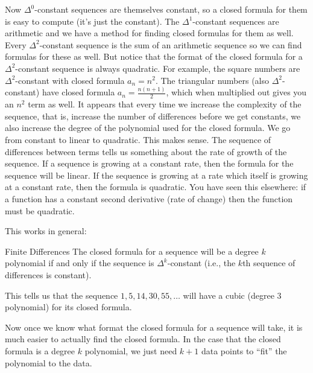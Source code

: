 \documentclass[12pt]{article}
\begin{document}
Now $\Delta^0$-constant sequences are themselves constant, so a closed formula for them is easy to compute (it's just the constant). The $\Delta^1$-constant sequences are arithmetic and we have a method for finding closed formulas for them as well.  Every $\Delta^2$-constant sequence is the sum of an arithmetic sequence so we can find formulas for these as well.  But notice that the format of the closed formula for a $\Delta^2$-constant sequence is always quadratic.  For example, the square numbers are $\Delta^2$-constant with closed formula $a_n= n^2$.  The triangular numbers (also $\Delta^2$-constant) have closed formula $a_n = \frac{n(n+1)}{2}$, which when multiplied out gives you an $n^2$ term as well.  It appears that every time we increase the complexity of the sequence, that is, increase the number of differences before we get constants, we also increase the degree of the polynomial used for the closed formula.  We go from constant to linear to quadratic.  This makes sense.  The sequence of differences between terms tells us something about the rate of growth of the sequence.  If a sequence is growing at a constant rate, then the formula for the sequence will be linear.  If the sequence is growing at a rate which itself is growing at a constant rate, then the formula is quadratic.  You have seen this elsewhere: if a function has a constant second derivative (rate of change) then the function must be quadratic.

This works in general:

\begin{defbox}{Finite Differences}
The closed formula for a sequence will be a degree $k$ polynomial if and only if the sequence is $\Delta^k$-constant (i.e., the $k$th sequence of differences is constant).
\end{defbox}

This tells us that the sequence $1, 5, 14, 30, 55, \ldots$ will have a cubic (degree 3 polynomial) for its closed formula.  

Now once we know what format the closed formula for a sequence will take, it is much easier to actually find the closed formula.  In the case that the closed formula is a degree $k$ polynomial, we just need $k+1$ data points to ``fit'' the polynomial to the data.
\end{document}
